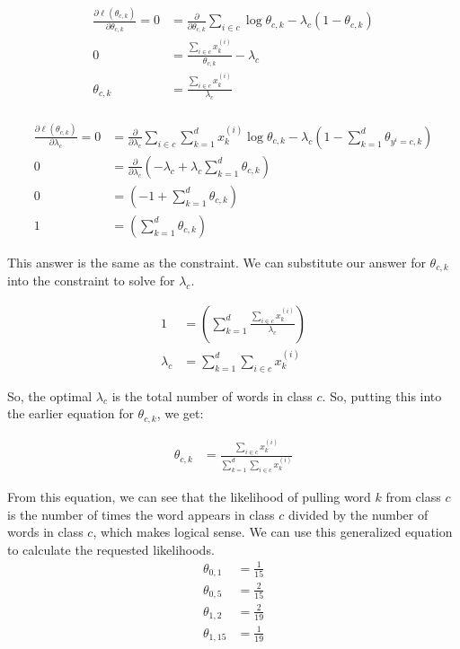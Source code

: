 \documentclass[12pt]{article}
\begin{document}
\begin{enumerate}
\begin{align*}
    \frac{\partial \ell(\theta_{c,k})}{\partial \theta_{c,k}} = 0 &=\frac{\partial}{\partial \theta_{c,k}} \sum_{i\in c} \log  \theta_{c, k} - \lambda_c(1-\theta_{c,k}) \\
    0 &=\frac{\sum_{i\in c} x_k^{(i)}}{\theta_{c,k}} - \lambda_c\\
    \theta_{c,k} &=\frac{\sum_{i\in c} x_k^{(i)}}{\lambda_c}\\
\end{align*}

\begin{align*}
    \frac{\partial \ell(\theta_{c,k})}{\partial \lambda_c} = 0 &=\frac{\partial}{\partial \lambda_c} \sum_{i\in c}\sum_{k=1}^d x_k^{(i)} \log  \theta_{c, k} - \lambda_c(1-\sum_{k=1}^d \theta_{y^i=c,k}) \\
    0 &=\frac{\partial}{\partial \lambda_c}( - \lambda_c + \lambda_c\sum_{k=1}^d \theta_{c,k}) \\
    0 &=( - 1 + \sum_{k=1}^d \theta_{c,k}) \\
    1 &=(\sum_{k=1}^d \theta_{c,k})
\end{align*}

This answer is the same as the constraint. We can substitute our answer for $\theta_{c,k}$ into the constraint to solve for $\lambda_c$.

\begin{align*}
    1 &=(\sum_{k=1}^d \frac{\sum_{i\in c} x_k^{(i)}}{\lambda_c}) \\
    \lambda_c &= \sum_{k=1}^d \sum_{i\in c} x_k^{(i)}
\end{align*}

So, the optimal $\lambda_c$ is the total number of words in class $c$. So, putting this into the earlier equation for $\theta_{c,k}$, we get:

\begin{align*}
    \theta_{c,k} &= \frac{\sum_{i\in c} x_k^{(i)}}{\sum_{k=1}^d \sum_{i\in c} x_k^{(i)}}
\end{align*}

From this equation, we can see that the likelihood of pulling word $k$ from class $c$ is the number of times the word appears in class $c$ divided by the number of words in class $c$, which makes logical sense. We can use this generalized equation to calculate the requested likelihoods.
\begin{align*}
    \theta_{0,1} &= \frac{1}{15}\\
    \theta_{0,5} &= \frac{2}{15}\\
    \theta_{1,2} &= \frac{2}{19}\\
    \theta_{1,15} &= \frac{1}{19}
\end{align*}


\end{enumerate}
\end{document}
